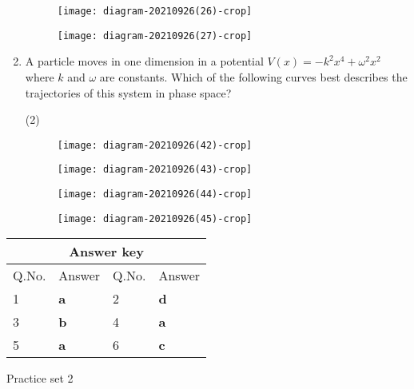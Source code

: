\begin{enumerate}
\begin{tasks}
\begin{figure}[H]
			\centering
			\texttt{[image: diagram-20210926(26)-crop]}
		\end{figure}
		\task[\textbf{D.}]\begin{figure}[H]
			\centering
			\texttt{[image: diagram-20210926(27)-crop]}
		\end{figure}
	\end{tasks}
	\item A particle moves in one dimension in a potential $V(x)=-k^{2} x^{4}+\omega^{2} x^{2}$ where $k$ and $\omega$ are constants. Which of the following curves best describes the trajectories of this system in phase space?
	{}
	\begin{tasks}(2)
		\task[\textbf{A.}]\begin{figure}[H]
			\centering
			\texttt{[image: diagram-20210926(42)-crop]}
		\end{figure}
		\task[\textbf{B.}]\begin{figure}[H]
			\centering
			\texttt{[image: diagram-20210926(43)-crop]}
		\end{figure}
		\task[\textbf{C.}]\begin{figure}[H]
			\centering
			\texttt{[image: diagram-20210926(44)-crop]}
		\end{figure}
		\task[\textbf{D.}]\begin{figure}[H]
			\centering
			\texttt{[image: diagram-20210926(45)-crop]}
		\end{figure}
	\end{tasks}
\end{enumerate}
\setlength\arrayrulewidth{1pt}
\begin{table}[H]
	\centering
	
	\begin{tabular}{|p{1.5cm}|p{1.5cm}||p{1.5cm}|p{1.5cm}|}
		\hline
		\multicolumn{4}{|c|}{\textbf{Answer key}}\\\hline\hline
		\rowcolor{ocrel}Q.No.&Answer&Q.No.&Answer\\\hline
		1&\textbf{a}&2&\textbf{d}\\\hline
		3&\textbf{b}&4&\textbf{a}\\\hline
		5&\textbf{a}&6&\textbf{c}\\\hline
	\end{tabular}
\end{table}
\newpage
\begin{abox}
	Practice set 2
\end{abox}
